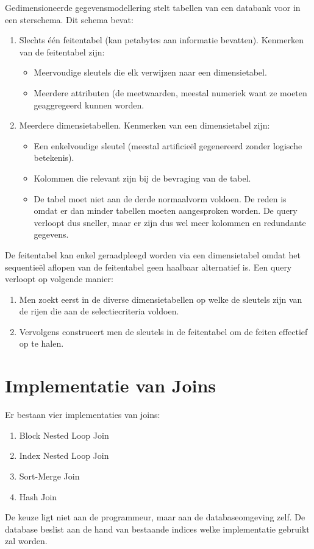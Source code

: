 \documentclass{article}
\begin{document}
Gedimensioneerde gegevensmodellering stelt tabellen van een databank voor in een sterschema. Dit schema bevat:
\begin{enumerate}
	\item {Slechts één feitentabel (kan petabytes aan informatie bevatten). Kenmerken van de feitentabel zijn:
		\begin{itemize}
			\item {Meervoudige sleutels die elk verwijzen naar een dimensietabel.}
			\item {Meerdere attributen (de meetwaarden, meestal numeriek want ze moeten geaggregeerd kunnen worden.}
		\end{itemize}}
	\item {Meerdere dimensietabellen. Kenmerken van een dimensietabel zijn:
		\begin{itemize}
			\item {Een enkelvoudige sleutel (meestal artificieël gegenereerd zonder logische betekenis).}
			\item {Kolommen die relevant zijn bij de bevraging van de tabel.}
			\item {De tabel moet niet aan de derde normaalvorm voldoen. De reden is omdat er dan minder tabellen moeten aangesproken worden. De query verloopt dus sneller, maar er zijn dus wel meer kolommen en redundante gegevens.}
		\end{itemize}
		
	}
\end{enumerate}

De feitentabel kan enkel geraadpleegd worden via een dimensietabel omdat het sequentieël aflopen van de feitentabel geen haalbaar alternatief is. Een query verloopt op volgende manier:
\begin{enumerate}
	\item {Men zoekt eerst in de diverse dimensietabellen op welke de sleutels zijn van de rijen die aan de selectiecriteria voldoen.}
	\item {Vervolgens construeert men de sleutels in de feitentabel om de feiten effectief op te halen.}
\end{enumerate}

\section{Implementatie van Joins}
Er bestaan vier implementaties van joins:
\begin{enumerate}
	\item {Block Nested Loop Join}
	\item {Index Nested Loop Join}
	\item {Sort-Merge Join}
	\item {Hash Join}
\end{enumerate}
De keuze ligt niet aan de programmeur, maar aan de databaseomgeving zelf. De database beslist aan de hand van bestaande indices welke implementatie gebruikt zal worden.
\end{document}
